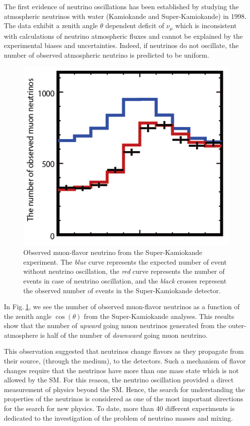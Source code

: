 \documentclass[twocolumn,secnumarabic,amssymb, nobibnotes, aps, prd,10pt]{revtex4-1}
\newcommand{\Fig}[1]{Fig.$\:$\ref{#1}}
\begin{document}
The first evidence of neutrino oscillations has been established by studying the 
atmospheric neutrinos with water \cite{Fukuda:1998mi, Ashie:2004mr} (Kamiokande and 
Super-Kamiokande) in 1998. The data exhibit a zenith angle $\theta$ dependent deficit of 
$\nu_\mu$ which is inconsistent with calculations of neutrino atmospheric fluxes and 
cannot be explained by the experimental biases and uncertainties. Indeed, if neutrinos
do not oscillate, the number of observed atmospheric neutrino is predicted to be
uniform.
\begin{figure}
\centering
\includegraphics[scale=0.425]{zenith.png}
\caption{Observed muon-flavor neutrino from the Super-Kamiokande experiment. The \emph{blue}
curve represents the expected number of event without neutrino oscillation, the \emph{red}
curve represents the number of events in case of neutrino oscillation, and the \emph{black}
crosses represent the observed number of events in the Super-Kamiokande detector.}
\label{fig:superKami}
\end{figure}
In \Fig{fig:superKami}, we see the number of observed muon-flavor neutrinos as a function of
the zenith angle $\cos (\theta)$ from the Super-Kamiokande analyses. This results show that
the number of \emph{upward} going muon neutrinos generated from the outer-atmosphere is half 
of the number of \emph{downward} going muon neutrino.

This observation suggested that neutrinos change flavors as they propagate from their source,
(through the medium), to the detectors. Such a mechanism of flavor changes require that the
neutrinos have more than one mass state which is not allowed by the SM. For this reason, the
neutrino oscillation provided a direct measurement of physics beyond the SM. Hence, the search
for understanding the properties of the neutrinos is considered as one of the most important
directions for the search for new physics. To date, more than 40 different experiments is
dedicated to the investigation of the problem of neutrino masses and mixing.
\end{document}
